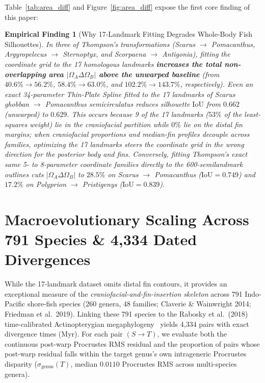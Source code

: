\documentclass[11pt,a4paper]{article}
\newtheorem{finding}[theorem]{Empirical Finding}
\theoremstyle{definition}
\theoremstyle{remark}
\newcommand{\IoU}{\mathrm{IoU}}
\begin{document}
Table~\ref{tab:area_diff} and Figure~\ref{fig:area_diff} expose the first core finding of this paper:
\begin{finding}[Why 17-Landmark Fitting Degrades Whole-Body Fish Silhouettes]
In three of Thompson's transformations (\emph{Scarus} $\to$ \emph{Pomacanthus}, \emph{Argyropelecus} $\to$ \emph{Sternoptyx}, and \emph{Scorpaena} $\to$ \emph{Antigonia}), fitting the coordinate grid to the 17 homologous landmarks \textbf{increases the total non-overlapping area $|\Omega_A \Delta \Omega_B|$ above the unwarped baseline} (from $40.6\% \to 56.2\%$, $58.4\% \to 63.0\%$, and $102.2\% \to 143.7\%$, respectively). Even an exact 34-parameter Thin-Plate Spline fitted to the 17 landmarks of \emph{Scarus ghobban} $\to$ \emph{Pomacanthus semicirculatus} reduces silhouette $\IoU$ from $0.662$ (unwarped) to $0.629$. This occurs because 9 of the 17 landmarks ($53\%$ of the least-squares weight) lie in the craniofacial partition while $0\%$ lie on the distal fin margins; when craniofacial proportions and median-fin profiles decouple across families, optimizing the 17 landmarks steers the coordinate grid in the wrong direction for the posterior body and fins. Conversely, fitting Thompson's exact same 5- to 8-parameter coordinate families directly to the 600-semilandmark outlines cuts $|\Omega_A \Delta \Omega_B|$ to $\mathbf{28.5\%}$ on \emph{Scarus} $\to$ \emph{Pomacanthus} ($\IoU = 0.749$) and $\mathbf{17.2\%}$ on \emph{Polyprion} $\to$ \emph{Pristigenys} ($\IoU = 0.839$).
\end{finding}

\section{Macroevolutionary Scaling Across 791 Species \& 4,334 Dated Divergences}

While the 17-landmark dataset omits distal fin contours, it provides an exceptional measure of the \emph{craniofacial-and-fin-insertion skeleton} across 791 Indo-Pacific shore-fish species (260 genera, 48 families; Claverie \& Wainwright 2014; Friedman et al.\ 2019). Linking these 791 species to the Rabosky et al.\ (2018) time-calibrated Actinopterygian megaphylogeny~\cite{Rabosky2018} yields 4,334 pairs with exact divergence times (Myr). For each pair $(S \to T)$, we evaluate both the continuous post-warp Procrustes RMS residual and the proportion of pairs whose post-warp residual falls within the target genus's own intrageneric Procrustes disparity ($\sigma_{\mathrm{genus}}(T)$, median $0.0110$ Procrustes RMS across multi-species genera).
\end{document}
